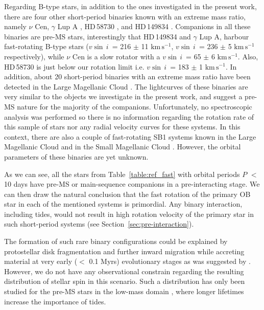 \documentclass{aa}
\newcommand{\kms}{$\mathrm{km\,s^{-1}}$}
\newcommand{\vsini} {$v\sin\,i$}
\DeclareRobustCommand{\Tabref}[1]{Table~\ref{#1}}
\DeclareRobustCommand{\Secref}[1]{Section~\ref{#1}}
\begin{document}
Regarding B-type stars, in addition to the ones investigated in the present work, there are four other short-period binaries known with an extreme mass ratio, namely $\nu$ Cen, $\gamma$ Lup A \citep[see,][]{Jerzykiewicz_2021}, HD\,58730 \citep{Stevens_2020}, and HD\,149834 \citep{Stassun_2021}.
Companions in all these binaries are pre-MS stars, interestingly that HD\,149834 and $\gamma$ Lup A,  harbour fast-rotating B-type stars (\vsini~= 216 $\pm$ 11 \kms, \vsini~= 236 $\pm$ 5 \kms~ respectively), while $\nu$ Cen is a slow rotator with a \vsini~=  65 $\pm$ 6 \kms.
Also, HD\,58730 is just below our rotation limit i.e. \vsini~= 183 $\pm$ 1 \kms.
In addition, about 20 short-period binaries with an extreme mass ratio have been detected in the Large Magellanic Cloud \citep[see][]{Moe_2015}. The lightcurves of these binaries are very similar to the objects we investigate in the present work, and \citeauthor{Moe_2015} suggest a pre-MS nature for the majority of the companions.
Unfortunately, no spectroscopic analysis was performed so there is no information regarding the rotation rate of this sample of stars nor any radial velocity curves for these systems.
In this context, there are also a couple of fast-rotating SB1 systems known in the Large Magellanic Cloud \citep[O-type primaries, see][]{vfts_2015_otype} and in the Small Magellanic Cloud \citep[B-type primaries, see][]{Bodensteiner_2023}. However, the orbital parameters of these binaries are yet unknown.

As we can see, all the stars from \Tabref{table:ref_fast} with
orbital periods $P$ $<$ 10 days have pre-MS or main-sequence companions in a pre-interacting stage.
We can then draw the natural conclusion that the fast rotation of the
primary OB star in each of the mentioned systems is primordial.
Any binary interaction, including tides, would not result in high
rotation velocity of the primary star in such short-period systems
(see \Secref{sec:pre-interaction}).


The formation of such rare binary configurations could be explained by
protostellar disk fragmentation and further inward migration while
accreting material at very early ($<$ 0.1 Myrs) evolutionary stages as was suggested by \cite{Tokovinin_2020}. However, we do not have any
observational constrain regarding the resulting distribution of stellar spin in
this scenario. Such a distribution has only been studied for the
pre-MS stars in the low-mass domain \citep[see
e.g.,][]{Serna_2021,Kounkel_2023}, where longer lifetimes increase
the importance of tides.
\end{document}
